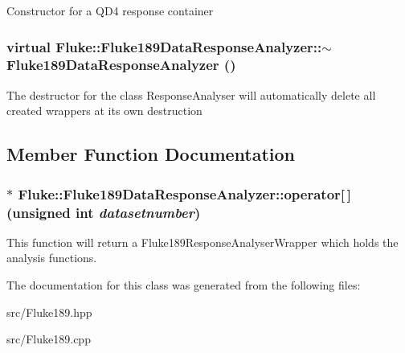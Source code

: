 \label{classFluke_1_1Fluke189DataResponseAnalyzer_a2501e803c1b0f92dee5d1c1249be62bc}
Constructor for a QD4 response container \hypertarget{classFluke_1_1Fluke189DataResponseAnalyzer_a8340ad62d9d5f3364482064eea967cef}{
\subsubsection[{$\sim$Fluke189DataResponseAnalyzer}]{\setlength{\rightskip}{0pt plus 5cm}virtual Fluke::Fluke189DataResponseAnalyzer::$\sim$Fluke189DataResponseAnalyzer ()}}
\label{classFluke_1_1Fluke189DataResponseAnalyzer_a8340ad62d9d5f3364482064eea967cef}
The destructor for the class ResponseAnalyser will automatically delete all created wrappers at its own destruction 

\subsection{Member Function Documentation}
\hypertarget{classFluke_1_1Fluke189DataResponseAnalyzer_ac946623b6b04e9ddb858a1d20fc753da}{
\subsubsection[{operator[]}]{$\ast$ Fluke::Fluke189DataResponseAnalyzer::operator\mbox{[}$\,$\mbox{]} (unsigned int {\em datasetnumber})}}
\label{classFluke_1_1Fluke189DataResponseAnalyzer_ac946623b6b04e9ddb858a1d20fc753da}
This function will return a Fluke189ResponseAnalyserWrapper which holds the analysis functions. 

The documentation for this class was generated from the following files:\begin{DoxyCompactItemize}
\item 
src/Fluke189.hpp\item 
src/Fluke189.cpp\end{DoxyCompactItemize}
